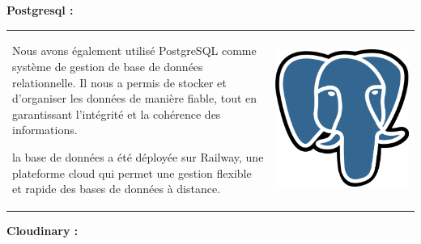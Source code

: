 \documentclass{article}
\begin{document}
\vspace{0,8cm}

\noindent \large \textbf {Postgresql \cite{postgresql}:}

\vspace{0,3cm}

\noindent
\begin{tabular}
{@{}m{}@{\hspace{1em}}m{}@{}}
Nous avons également utilisé PostgreSQL comme système de gestion de base de données relationnelle. Il nous a permis de stocker et d’organiser les données de manière fiable, tout en garantissant l’intégrité et la cohérence des informations. 

la base de données a été déployée sur Railway, une plateforme cloud qui permet une gestion flexible et rapide des bases de données à distance.
&
\includegraphics[width=\linewidth]{postgre.png} %
\end{tabular}

\vspace{0,8cm}

\noindent \large \textbf {Cloudinary \cite{cloudinary}:}
\end{document}
